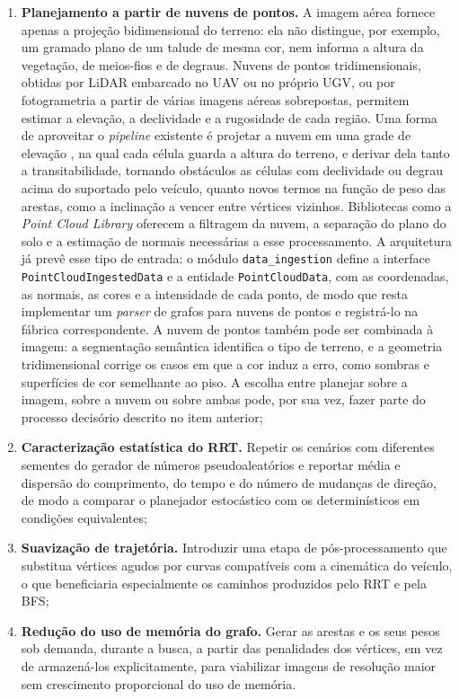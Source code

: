 \documentclass[
    12pt,
    openright,
    oneside,
    a4paper,
    english,
    brazil
]{abntex2}
\begin{document}
\begin{enumerate}
    \item \textbf{Planejamento a partir de nuvens de pontos.} A imagem aérea fornece apenas a projeção bidimensional do terreno: ela não distingue, por exemplo, um gramado plano de um talude de mesma cor, nem informa a altura da vegetação, de meios-fios e de degraus. Nuvens de pontos tridimensionais, obtidas por LiDAR embarcado no UAV ou no próprio UGV, ou por fotogrametria a partir de várias imagens aéreas sobrepostas, permitem estimar a elevação, a declividade e a rugosidade de cada região. Uma forma de aproveitar o \textit{pipeline} existente é projetar a nuvem em uma grade de elevação \cite{fankhauser2016}, na qual cada célula guarda a altura do terreno, e derivar dela tanto a transitabilidade, tornando obstáculos as células com declividade ou degrau acima do suportado pelo veículo, quanto novos termos na função de peso das arestas, como a inclinação a vencer entre vértices vizinhos. Bibliotecas como a \textit{Point Cloud Library} \cite{rusu2011} oferecem a filtragem da nuvem, a separação do plano do solo e a estimação de normais necessárias a esse processamento. A arquitetura já prevê esse tipo de entrada: o módulo \texttt{data\_\allowbreak{}ingestion} define a interface \texttt{PointCloudIngestedData} e a entidade \texttt{PointCloudData}, com as coordenadas, as normais, as cores e a intensidade de cada ponto, de modo que resta implementar um \textit{parser} de grafos para nuvens de pontos e registrá-lo na fábrica correspondente. A nuvem de pontos também pode ser combinada à imagem: a segmentação semântica identifica o tipo de terreno, e a geometria tridimensional corrige os casos em que a cor induz a erro, como sombras e superfícies de cor semelhante ao piso. A escolha entre planejar sobre a imagem, sobre a nuvem ou sobre ambas pode, por sua vez, fazer parte do processo decisório descrito no item anterior;
    \item \textbf{Caracterização estatística do RRT.} Repetir os cenários com diferentes sementes do gerador de números pseudoaleatórios e reportar média e dispersão do comprimento, do tempo e do número de mudanças de direção, de modo a comparar o planejador estocástico com os determinísticos em condições equivalentes;
    \item \textbf{Suavização de trajetória.} Introduzir uma etapa de pós-processamento que substitua vértices agudos por curvas compatíveis com a cinemática do veículo, o que beneficiaria especialmente os caminhos produzidos pelo RRT e pela BFS;
    \item \textbf{Redução do uso de memória do grafo.} Gerar as arestas e os seus pesos sob demanda, durante a busca, a partir das penalidades dos vértices, em vez de armazená-los explicitamente, para viabilizar imagens de resolução maior sem crescimento proporcional do uso de memória.
\end{enumerate}
\end{document}
